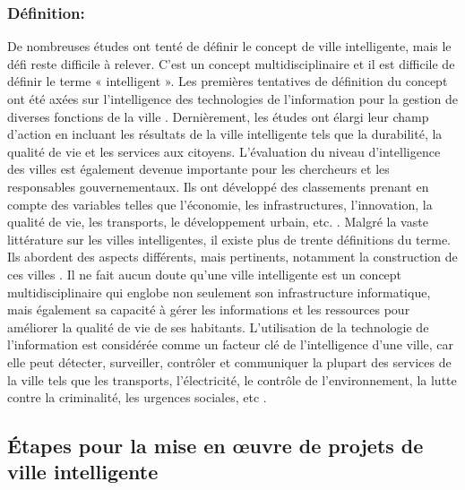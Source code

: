 \documentclass[french, a4paper, 12pt]{report}
\begin{document}
\subsubsection{Définition:}
De nombreuses études ont tenté de définir le concept de ville intelligente, mais le défi reste difficile à relever. C’est un concept multidisciplinaire et il est difficile de définir le terme « intelligent ». Les premières tentatives de définition du concept ont été axées sur l'intelligence des technologies de l'information pour la gestion de diverses fonctions de la ville \cite{3}. 
Dernièrement, les études ont élargi leur champ d'action en incluant les résultats de la ville intelligente tels que la durabilité, la qualité de vie et les services aux citoyens.
L'évaluation du niveau d'intelligence des villes est également devenue importante pour les chercheurs et les responsables gouvernementaux. Ils ont développé des classements prenant en compte des variables telles que l'économie, les infrastructures, l'innovation, la qualité de vie, les transports, le développement urbain, etc. \cite{4}.
Malgré la vaste littérature sur les villes intelligentes, il existe plus de trente définitions du terme. Ils abordent des aspects différents, mais pertinents, notamment la construction de ces villes \cite{5}. 
Il ne fait aucun doute qu'une ville intelligente est un concept multidisciplinaire qui englobe non seulement son infrastructure informatique, mais également sa capacité à gérer les informations et les ressources pour améliorer la qualité de vie de ses habitants. L'utilisation de la technologie de l'information est considérée comme un facteur clé de l'intelligence d'une ville, car elle peut détecter, surveiller, contrôler et communiquer la plupart des services de la ville tels que les transports, l'électricité, le contrôle de l'environnement, la lutte contre la criminalité, les urgences sociales, etc \cite{6}.
\subsection{Étapes pour la mise en œuvre de projets de ville intelligente}
\end{document}
